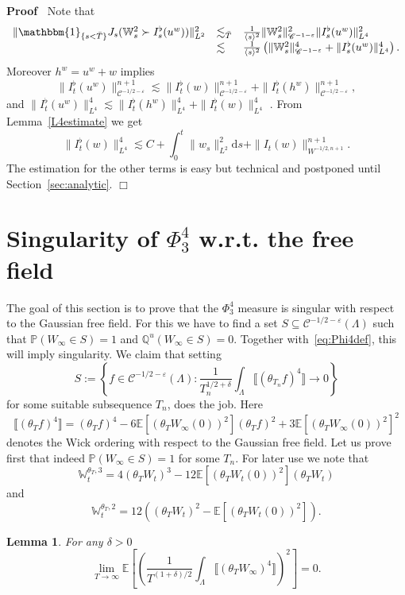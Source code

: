\documentclass[11pt]{article}
\newcommand{\assign}{:=}
\newcommand{\mathd}{\mathrm{d}}
\newenvironment{proof}{\noindent\textbf{Proof\ }}{\hspace*{\fill}$\Box$\medskip}
\newtheorem{lemma}{Lemma}
\newcommand{\VV}{\mathscr{C}}
\begin{document}
\begin{proof}
  Note that
  \[ \begin{array}{lll}
       \| \mathbbm{1}_{\{ s < \bar{T} \}} J_s (\mathbb{W}_s^2 \succ
       I_s^{\flat} (u^w)) \|_{L^2}^2 & \lesssim_{\bar{T}} & \frac{1}{\langle s
       \rangle^2} \| \mathbb{W}_s^2 \|^2_{\VV^{- 1 - \varepsilon}} \|
       I_s^{\flat} (u^w) \|^2_{L^4}\\
       & \lesssim & \frac{1}{\langle s \rangle^2} \left( \| \mathbb{W}_s^2
       \|^4_{\VV^{- 1 - \varepsilon}} + \| I_s^{\flat} (u^w) \|^4_{L^4}
       \right) .
     \end{array} \]
  Moreover $h^w = u^w + w$ implies
  \[ \|I^{\flat}_t (u^w) \|^{n + 1}_{\VV^{- 1 / 2 - \varepsilon}} \lesssim
     \|I^{\flat}_t (w) \|^{n + 1}_{\VV^{- 1 / 2 - \varepsilon}} +
     \|I_t^{\flat} (h^w) \|^{n + 1}_{\VV^{- 1 / 2 - \varepsilon}}, \]
  and $\| I^{\flat}_t (u^w) \|^4_{L^4} \lesssim \| I^{\flat}_t (h^w)
  \|^4_{L^4} + \| I^{\flat}_t (w) \|^4_{L^4}$ . From Lemma~\ref{L4estimate} we
  get
  \[ \| I^{\flat}_t (w) \|^4_{L^4} \lesssim C + \int^t_0 \| w_s \|_{L^2}^2
     \mathd s + \| I_t (w) \|^{n + 1}_{W^{- 1 / 2, n + 1}} . \]
  The estimation for the other terms is easy but technical and postponed until
  Section~\ref{sec:analytic}.
\end{proof}

\section[Singularity of Phi43 w.r.t. the free field]{Singularity of $\Phi_3^4$ w.r.t. the free field}

The goal of this section is to prove that the $\Phi_3^4$ measure is singular
with respect to the Gaussian free field. For this we have to find a set $S
\subseteq \VV^{- 1 / 2 - \varepsilon} (\Lambda)$ such that $\mathbb{P}
(W_{\infty} \in S) = 1$ and $\mathbb{Q}^u (W_{\infty} \in S) = 0$. Together
with~{\eqref{eq:Phi4def}}, this will imply singularity. We claim that setting
\[ S \assign \left\{ f \in \VV^{- 1 / 2 - \varepsilon} (\Lambda) :
   \frac{1}{T_n^{1 / 2 + \delta}} \int_{\Lambda} \llbracket (\theta_{T_n} f)^4
   \rrbracket \rightarrow 0 \right\} \]
for some suitable subsequence $T_n$, does the job. Here
\[ \llbracket (\theta_T f)^4 \rrbracket = (\theta_T f)^4 - 6\mathbb{E}
   [(\theta_T W_{\infty} (0))^2] (\theta_T f)^2 + 3\mathbb{E} [(\theta_T
   W_{\infty} (0))^2]^2 \]
denotes the Wick ordering with respect to the Gaussian free field. Let us
prove first that indeed $\mathbb{P} (W_{\infty} \in S) = 1$ for some $T_n$.
For later use we note that
\[ \mathbb{W}_t^{\theta_T, 3} = 4 (\theta_T W_t)^3 - 12\mathbb{E} [(\theta_T
   W_t (0))^2] (\theta_T W_t) \]
and
\[ \mathbb{W}_t^{\theta_T, 2} = 12 ((\theta_T W_t)^2 -\mathbb{E} [(\theta_T
   W_t (0))^2]) . \]
\begin{lemma}
  For any $\delta > 0$
  \[ \lim_{T \rightarrow \infty} \mathbb{E} \left[ \left( \frac{1}{T^{(1 +
     \delta) / 2}} \int_{\Lambda} \llbracket (\theta_T W_{\infty})^4
     \rrbracket \right)^2 \right] = 0. \]
\end{lemma}
\end{document}
